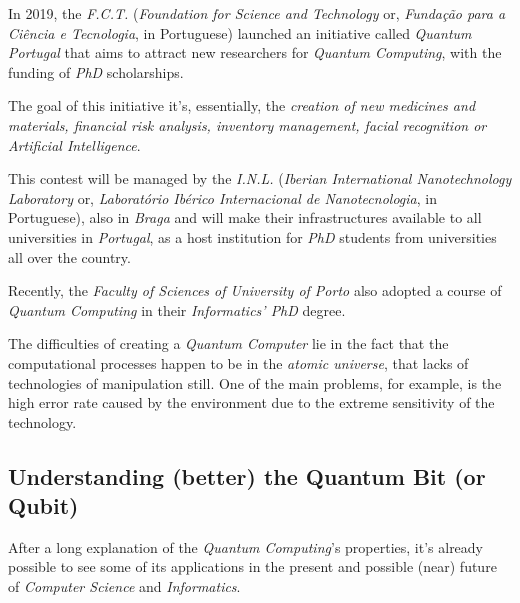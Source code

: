 \documentclass[conference]{IEEEtran}
\begin{document}
\vspace{4pt}

In 2019, the \textit{F.C.T.} (\textit{Foundation for Science and Technology} or, \textit{Funda\c{c}\~{a}o para a Ci\^{e}ncia e Tecnologia}, in Portuguese) launched an initiative called \textit{Quantum Portugal} that aims to attract new researchers for \textit{Quantum Computing}, with the funding of \textit{PhD} scholarships.

\vspace{4pt}

The goal of this initiative it's, essentially, the \textit{creation of new medicines and materials, financial risk analysis, inventory management, facial recognition or Artificial Intelligence}.

\vspace{4pt}

This contest will be managed by the \textit{I.N.L.} (\textit{Iberian International Nanotechnology Laboratory} or, \textit{Laborat\'orio Ib\'erico Internacional de Nanotecnologia}, in Portuguese), also in \textit{Braga} and will make their infrastructures available to all universities in \textit{Portugal}, as a host institution for \textit{PhD} students from universities all over the country.

\vspace{4pt}

Recently, the \textit{Faculty of Sciences of University of Porto} also adopted a course of \textit{Quantum Computing} in their \textit{Informatics' PhD} degree.

\vspace{4pt}

The difficulties of creating a \textit{Quantum Computer} lie in the fact that the computational processes happen to be in the \textit{atomic universe}, that lacks of technologies of manipulation still. One of the main problems, for example, is the high error rate caused by the environment due to the extreme sensitivity of the technology.

\vspace{6pt}

\subsection{Understanding (better) the Quantum Bit (or Qubit)}

After a long explanation of the \textit{Quantum Computing}'s properties, it's already possible to see some of its applications in the present and possible (near) future of \textit{Computer Science} and \textit{Informatics}.
\end{document}
